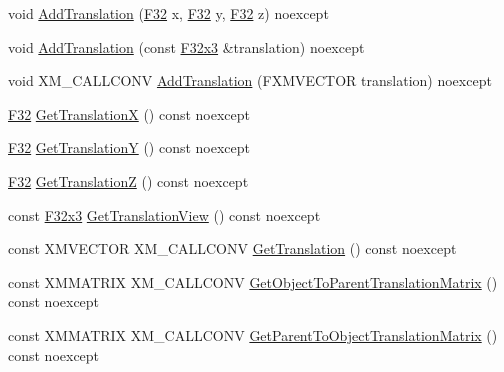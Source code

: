 \begin{DoxyCompactItemize}
\item 
void \mbox{\hyperlink{classmage_1_1_s_e_t_transform3_d_a7de1b5e14856a9b16b10c3a9fd84fa54}{Add\+Translation}} (\mbox{\hyperlink{namespacemage_aa97e833b45f06d60a0a9c4fc22ae02c0}{F32}} x, \mbox{\hyperlink{namespacemage_aa97e833b45f06d60a0a9c4fc22ae02c0}{F32}} y, \mbox{\hyperlink{namespacemage_aa97e833b45f06d60a0a9c4fc22ae02c0}{F32}} z) noexcept
\item 
void \mbox{\hyperlink{classmage_1_1_s_e_t_transform3_d_a8cdbae5ef048223f49a474c635d03c4a}{Add\+Translation}} (const \mbox{\hyperlink{namespacemage_a1e3c7a882af461f161caa1cbddaf1fa2}{F32x3}} \&translation) noexcept
\item 
void X\+M\+\_\+\+C\+A\+L\+L\+C\+O\+NV \mbox{\hyperlink{classmage_1_1_s_e_t_transform3_d_aae25e5afcacb57b876b0d289ec7dbc82}{Add\+Translation}} (F\+X\+M\+V\+E\+C\+T\+OR translation) noexcept
\item 
\mbox{\hyperlink{namespacemage_aa97e833b45f06d60a0a9c4fc22ae02c0}{F32}} \mbox{\hyperlink{classmage_1_1_s_e_t_transform3_d_a76992521d11991bc78f8430725f784ca}{Get\+TranslationX}} () const noexcept
\item 
\mbox{\hyperlink{namespacemage_aa97e833b45f06d60a0a9c4fc22ae02c0}{F32}} \mbox{\hyperlink{classmage_1_1_s_e_t_transform3_d_a92dac47943f13843094946639444a5ed}{Get\+TranslationY}} () const noexcept
\item 
\mbox{\hyperlink{namespacemage_aa97e833b45f06d60a0a9c4fc22ae02c0}{F32}} \mbox{\hyperlink{classmage_1_1_s_e_t_transform3_d_a60627383e0448f2baf5cac5d01f8fed9}{Get\+TranslationZ}} () const noexcept
\item 
const \mbox{\hyperlink{namespacemage_a1e3c7a882af461f161caa1cbddaf1fa2}{F32x3}} \mbox{\hyperlink{classmage_1_1_s_e_t_transform3_d_af7452f8367721a779a39fb878a5295af}{Get\+Translation\+View}} () const noexcept
\item 
const X\+M\+V\+E\+C\+T\+OR X\+M\+\_\+\+C\+A\+L\+L\+C\+O\+NV \mbox{\hyperlink{classmage_1_1_s_e_t_transform3_d_ae2d7793e50077bde1d9519d15c19ebd7}{Get\+Translation}} () const noexcept
\item 
const X\+M\+M\+A\+T\+R\+IX X\+M\+\_\+\+C\+A\+L\+L\+C\+O\+NV \mbox{\hyperlink{classmage_1_1_s_e_t_transform3_d_a0ee45116a600409a85fee9bfce479a4e}{Get\+Object\+To\+Parent\+Translation\+Matrix}} () const noexcept
\item 
const X\+M\+M\+A\+T\+R\+IX X\+M\+\_\+\+C\+A\+L\+L\+C\+O\+NV \mbox{\hyperlink{classmage_1_1_s_e_t_transform3_d_aa0a2c7219d385789a53e84cc016a154a}{Get\+Parent\+To\+Object\+Translation\+Matrix}} () const noexcept

\end{DoxyCompactItemize}
